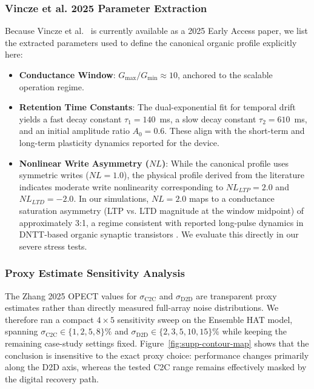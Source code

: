 \FloatBarrier

\subsubsection{Vincze et al. 2025 Parameter Extraction}

Because Vincze et al.\ \citep{vincze2025dualplasticity} is currently available as a 2025 Early Access paper, we list the extracted parameters used to define the canonical organic profile explicitly here:

\begin{itemize}
    \item \textbf{Conductance Window}: $G_{\max}/G_{\min} \approx 10$, anchored to the scalable operation regime.
    \item \textbf{Retention Time Constants}: The dual-exponential fit for temporal drift yields a fast decay constant $\tau_1 = 140$~ms, a slow decay constant $\tau_2 = 610$~ms, and an initial amplitude ratio $A_0 = 0.6$. These align with the short-term and long-term plasticity dynamics reported for the device.
    \item \textbf{Nonlinear Write Asymmetry ($NL$)}: While the canonical profile uses symmetric writes ($NL=1.0$), the physical profile derived from the literature indicates moderate write nonlinearity corresponding to $NL_{LTP} = 2.0$ and $NL_{LTD} = -2.0$. In our simulations, $NL=2.0$ maps to a conductance saturation asymmetry (LTP vs. LTD magnitude at the window midpoint) of approximately 3:1, a regime consistent with reported long-pulse dynamics in DNTT-based organic synaptic transistors \citep{vincze2025dualplasticity}. We evaluate this directly in our severe stress tests.
\end{itemize}

\subsubsection{Proxy Estimate Sensitivity Analysis}

The Zhang 2025 OPECT values for \(\sigma_{\mathrm{C2C}}\) and \(\sigma_{\mathrm{D2D}}\) are transparent proxy estimates rather than directly measured full-array noise distributions. We therefore ran a compact \(4 \times 5\) sensitivity sweep on the Ensemble HAT model, spanning \(\sigma_{\mathrm{C2C}} \in \{1, 2, 5, 8\}\%\) and \(\sigma_{\mathrm{D2D}} \in \{2, 3, 5, 10, 15\}\%\) while keeping the remaining case-study settings fixed. Figure~\ref{fig:supp-contour-map} shows that the conclusion is insensitive to the exact proxy choice: performance changes primarily along the D2D axis, whereas the tested C2C range remains effectively masked by the digital recovery path.

